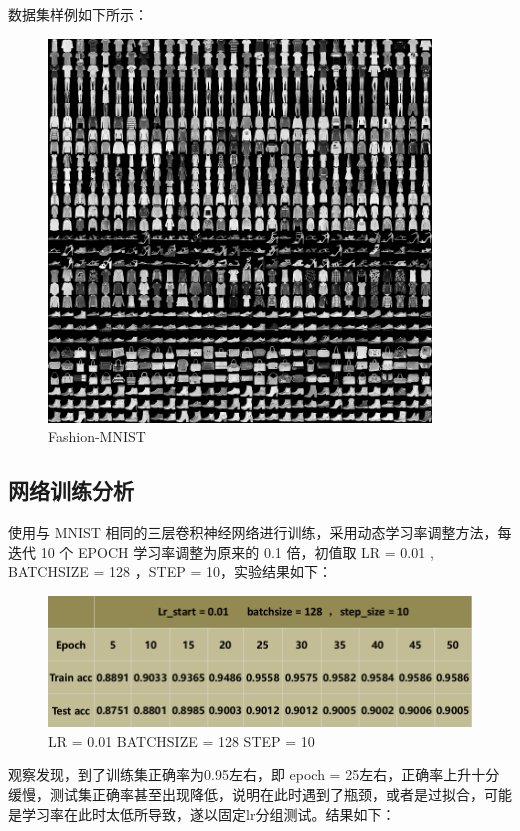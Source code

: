 \documentclass[12pt]{article}
\begin{document}
	数据集样例如下所示：
	
	\begin{figure}[H]
		\centering
		\includegraphics[width=4in]{./images/fashion_example.png}
		\centering
		\caption{Fashion-MNIST}
	\end{figure}
	
	\subsection{网络训练分析}
	
	使用与 MNIST 相同的三层卷积神经网络进行训练，采用动态学习率调整方法，每迭代 10 个 EPOCH 学习率调整为原来的 0.1 倍，初值取 LR = 0.01 ,  BATCHSIZE = 128 ，STEP = 10，实验结果如下：
	
	\begin{figure}[H]
		\centering
		\includegraphics[width=6in]{./images/fashion1.png}
		\centering
		\caption{LR = 0.01 BATCHSIZE = 128 STEP = 10}
	\end{figure}

	观察发现，到了训练集正确率为0.95左右，即 epoch = 25左右，正确率上升十分缓慢，测试集正确率甚至出现降低，说明在此时遇到了瓶颈，或者是过拟合，可能是学习率在此时太低所导致，遂以固定lr分组测试。结果如下：
	
\end{document}
